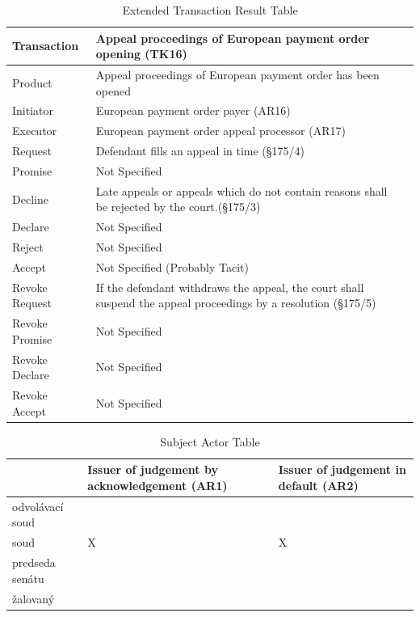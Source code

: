 \begin{landscape}
\begin{table}[h]
\caption{Extended Transaction Result Table}
\label{tab:etrt}
\begin{tabular}{|l||l|l|}
\hline
Transaction  &   Appeal proceedings of European payment order opening (TK16) \\ \hline
Product      &  Appeal proceedings of European payment order has been opened \\ \hline
Initiator      &  European payment order payer (AR16)\\ \hline
Executor       &  European payment order appeal processor (AR17) \\ \hline
Request        &   Defendant fills an appeal in time (\S175/4) \\ \hline
Promise        &    Not Specified   \\ \hline
Decline        &  Late appeals or appeals which do not contain reasons shall be rejected by the court.(\S175/3)  \\ \hline
Declare        &  Not Specified  \\ \hline
Reject         &  Not Specified   \\ \hline
Accept         & Not Specified (Probably Tacit) \\ \hline
Revoke Request & If the defendant withdraws the appeal, the court shall suspend the appeal proceedings by a resolution (\S175/5)      \\ \hline
Revoke Promise & Not Specified  \\ \hline
Revoke Declare & Not Specified      \\ \hline
Revoke Accept  &  Not Specified \\ \hline
\end{tabular}
\end{table}


\begin{table}[h]
\caption{Subject Actor Table}
\label{tab:subjectactortable}
\begin{tabular}{|l|l|l|}
\hline
  & Issuer of judgement by acknowledgement (AR1)  &  Issuer of judgement in default (AR2)   \\ \hline
odvolávací soud &  &  \\ \hline
soud & X & X  \\ \hline
predseda senátu &  &  \\ \hline
žalovaný & &  \\ \hline
\end{tabular}
\end{table}


\end{landscape}
